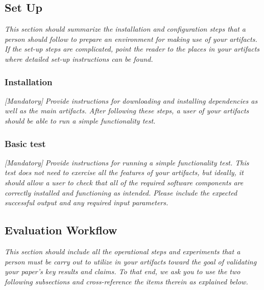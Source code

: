 \documentclass[sigconf]{acmart}
\begin{document}
	
	\subsection{Set Up}
	
	\emph{This section should summarize the installation and configuration
		steps that a person should follow to prepare an environment for making
		use of your artifacts.  If the set-up steps are complicated, point the
		reader to the places in your artifacts where detailed set-up
		instructions can be found.}
	
	
	\subsubsection{Installation}
	
	\emph{[Mandatory]}
	\emph{Provide instructions for downloading and installing dependencies
		as well as the main artifacts.  After following these steps, a user of
		your artifacts should be able to run a simple functionality test.}
	
	
	\subsubsection{Basic test}
	
	\emph{[Mandatory]}
	\emph{Provide instructions for running a simple functionality test.
		This test does not need to exercise all the features of your
		artifacts, but ideally, it should allow a user to check that all of
		the required software components are correctly installed and
		functioning as intended.  Please include the expected successful
		output and any required input parameters.}
	
	
	\subsection{Evaluation Workflow}
	
	\emph{This section should include all the operational steps and
		experiments that a person must be carry out to utilize in your
		artifacts toward the goal of validating your paper's key results and
		claims.  To that end, we ask you to use the two following subsections
		and cross-reference the items therein as explained below.}
	
\end{document}
